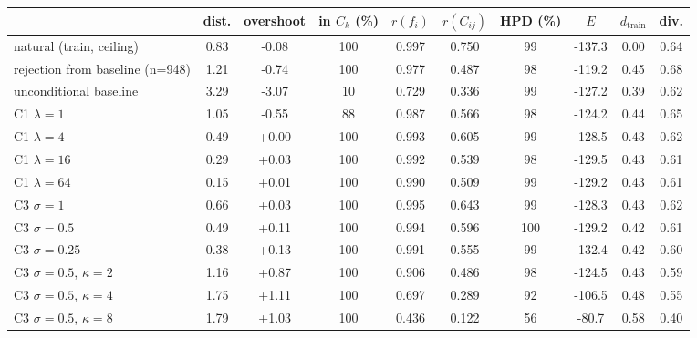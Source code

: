 \begin{tabular}{lccccccccc}
\toprule
 & dist. & overshoot & in $C_k$ (\%) & $r(f_i)$ & $r(C_{ij})$ & HPD (\%) & $E$ & $d_\text{train}$ & div. \\
\midrule
natural (train, ceiling) & 0.83 & -0.08 & 100 & 0.997 & 0.750 & 99 & -137.3 & 0.00 & 0.64 \\
rejection from baseline (n=948) & 1.21 & -0.74 & 100 & 0.977 & 0.487 & 98 & -119.2 & 0.45 & 0.68 \\
unconditional baseline & 3.29 & -3.07 & 10 & 0.729 & 0.336 & 99 & -127.2 & 0.39 & 0.62 \\
\midrule
C1 $\lambda{=}1$ & 1.05 & -0.55 & 88 & 0.987 & 0.566 & 98 & -124.2 & 0.44 & 0.65 \\
C1 $\lambda{=}4$ & 0.49 & +0.00 & 100 & 0.993 & 0.605 & 99 & -128.5 & 0.43 & 0.62 \\
C1 $\lambda{=}16$ & 0.29 & +0.03 & 100 & 0.992 & 0.539 & 98 & -129.5 & 0.43 & 0.61 \\
C1 $\lambda{=}64$ & 0.15 & +0.01 & 100 & 0.990 & 0.509 & 99 & -129.2 & 0.43 & 0.61 \\
\midrule
C3 $\sigma{=}1$ & 0.66 & +0.03 & 100 & 0.995 & 0.643 & 99 & -128.3 & 0.43 & 0.62 \\
C3 $\sigma{=}0.5$ & 0.49 & +0.11 & 100 & 0.994 & 0.596 & 100 & -129.2 & 0.42 & 0.61 \\
C3 $\sigma{=}0.25$ & 0.38 & +0.13 & 100 & 0.991 & 0.555 & 99 & -132.4 & 0.42 & 0.60 \\
C3 $\sigma{=}0.5$, $\kappa{=}2$ & 1.16 & +0.87 & 100 & 0.906 & 0.486 & 98 & -124.5 & 0.43 & 0.59 \\
C3 $\sigma{=}0.5$, $\kappa{=}4$ & 1.75 & +1.11 & 100 & 0.697 & 0.289 & 92 & -106.5 & 0.48 & 0.55 \\
C3 $\sigma{=}0.5$, $\kappa{=}8$ & 1.79 & +1.03 & 100 & 0.436 & 0.122 & 56 & -80.7 & 0.58 & 0.40 \\
\bottomrule
\end{tabular}
